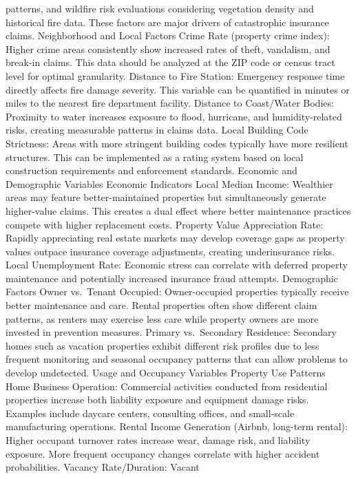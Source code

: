 \documentclass[8pt, twocolumn]{extarticle}
\begin{document}
patterns, and wildfire risk evaluations considering vegetation density
and historical fire data. These factors are major drivers of
catastrophic insurance claims. Neighborhood and Local Factors Crime Rate
(property crime index): Higher crime areas consistently show increased
rates of theft, vandalism, and break-in claims. This data should be
analyzed at the ZIP code or census tract level for optimal granularity.
Distance to Fire Station: Emergency response time directly affects fire
damage severity. This variable can be quantified in minutes or miles to
the nearest fire department facility. Distance to Coast/Water Bodies:
Proximity to water increases exposure to flood, hurricane, and
humidity-related risks, creating measurable patterns in claims data.
Local Building Code Strictness: Areas with more stringent building codes
typically have more resilient structures. This can be implemented as a
rating system based on local construction requirements and enforcement
standards. Economic and Demographic Variables Economic Indicators Local
Median Income: Wealthier areas may feature better-maintained properties
but simultaneously generate higher-value claims. This creates a dual
effect where better maintenance practices compete with higher
replacement costs. Property Value Appreciation Rate: Rapidly
appreciating real estate markets may develop coverage gaps as property
values outpace insurance coverage adjustments, creating underinsurance
risks. Local Unemployment Rate: Economic stress can correlate with
deferred property maintenance and potentially increased insurance fraud
attempts. Demographic Factors Owner vs.~Tenant Occupied: Owner-occupied
properties typically receive better maintenance and care. Rental
properties often show different claim patterns, as renters may exercise
less care while property owners are more invested in prevention
measures. Primary vs.~Secondary Residence: Secondary homes such as
vacation properties exhibit different risk profiles due to less frequent
monitoring and seasonal occupancy patterns that can allow problems to
develop undetected. Usage and Occupancy Variables Property Use Patterns
Home Business Operation: Commercial activities conducted from
residential properties increase both liability exposure and equipment
damage risks. Examples include daycare centers, consulting offices, and
small-scale manufacturing operations. Rental Income Generation (Airbnb,
long-term rental): Higher occupant turnover rates increase wear, damage
risk, and liability exposure. More frequent occupancy changes correlate
with higher accident probabilities. Vacancy Rate/Duration: Vacant
\end{document}
